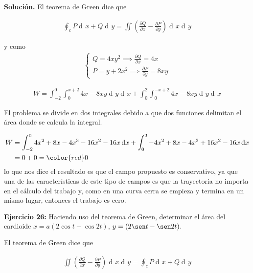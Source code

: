 \documentclass[12pt]{article}
\DeclareMathOperator{\di}{d\!}
\begin{document}
\noindent \textbf{Solución.}
\vspace{3mm}
El teorema de Green dice que 

\begin{align*}
	\oint_c P \di x + Q \di y = \iint \left( \frac{\partial Q}{\partial x} 
	- \frac{\partial P}{\partial y} \right) \di x \di y
\end{align*}

y como 
\begin{align*}
	\begin{cases}
		Q = 4xy^2 \implies 	\frac{\partial Q}{\partial x} = 4x \\ 
		P = y + 2x^2 \implies  \frac{\partial P}{\partial y} = 8xy	
	\end{cases}
\end{align*}

\begin{align*}
	W = \int_{-2}^{0} \int_0^{x+2} 4x -8xy \di y \di x 
	+ \int_0^2 \int_0^{-x+2} 4x-8xy \di y \di x
\end{align*}

El problema se divide en dos integrales debido a que dos funciones delimitan el área donde
se calcula la integral.

\begin{align*}
	W &= \int_{-2}^0 4x^2 + 8x - 4x^3 - 16x^2 -16x \di x + \int_0^2 -4x^2 + 8x -4 x^3 + 16x^2
	- 16x \di x \\
	& = 0 + 0 = \color{red} 0
\end{align*}
lo que nos dice el resultado es que el campo propuesto es conservativo, ya que una de las 
características de este tipo de campos es que la trayectoria no importa en el cálculo del
trabajo y, como en una curva cerra se empieza y termina en un mismo lugar, entonces
el trabajo es cero.

\vspace{5mm}

\noindent \textbf{Ejercicio 26:} Haciendo uso del teorema de Green, determinar el área del 
cardioide $x = a(2\cos t - \cos 2t)$, $y = (2\sen t - \sen 2t)$.
\vspace{5mm}

\vspace{3mm}
El teorema de Green dice que 

\begin{align*}
	\iint \left( \frac{\partial Q}{\partial x} 
	- \frac{\partial P}{\partial y} \right) \di x \di y =
	\oint_c P \di x + Q \di y  
\end{align*}
\end{document}
